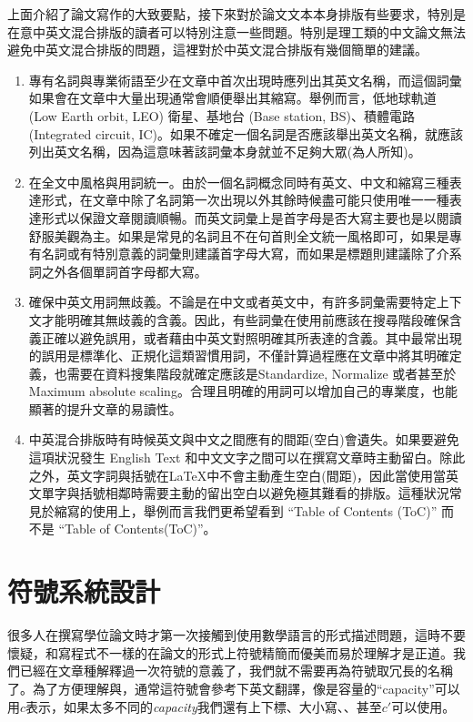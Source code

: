\documentclass[12pt]{report}
\theoremstyle{plain}
\begin{document}
上面介紹了論文寫作的大致要點，接下來對於論文文本本身排版有些要求，特別是在意中英文混合排版的讀者可以特別注意一些問題。特別是理工類的中文論文無法避免中英文混合排版的問題，這裡對於中英文混合排版有幾個簡單的建議。
\begin{enumerate}
    \item 專有名詞與專業術語至少在文章中首次出現時應列出其英文名稱，而這個詞彙如果會在文章中大量出現通常會順便舉出其縮寫。舉例而言，低地球軌道 (Low Earth orbit, LEO) 衛星、基地台 (Base station, BS)、積體電路 (Integrated circuit, IC)。如果不確定一個名詞是否應該舉出英文名稱，就應該列出英文名稱，因為這意味著該詞彙本身就並不足夠大眾(為人所知)。
    \item 在全文中風格與用詞統一。由於一個名詞概念同時有英文、中文和縮寫三種表達形式，在文章中除了名詞第一次出現以外其餘時候盡可能只使用唯一一種表達形式以保證文章閱讀順暢。而英文詞彙上是首字母是否大寫主要也是以閱讀舒服美觀為主。如果是常見的名詞且不在句首則全文統一風格即可，如果是專有名詞或有特別意義的詞彙則建議首字母大寫，而如果是標題則建議除了介系詞之外各個單詞首字母都大寫。
    \item 確保中英文用詞無歧義。不論是在中文或者英文中，有許多詞彙需要特定上下文才能明確其無歧義的含義。因此，有些詞彙在使用前應該在搜尋階段確保含義正確以避免誤用，或者藉由中英文對照明確其所表達的含義。其中最常出現的誤用是標準化、正規化這類習慣用詞，不僅計算過程應在文章中將其明確定義，也需要在資料搜集階段就確定應該是Standardize, Normalize 或者甚至於 Maximum absolute scaling。合理且明確的用詞可以增加自己的專業度，也能顯著的提升文章的易讀性。
    \item 中英混合排版時有時候英文與中文之間應有的間距(空白)會遺失。如果要避免這項狀況發生 English Text 和中文文字之間可以在撰寫文章時主動留白。除此之外，英文字詞與括號在\LaTeX 中不會主動產生空白(間距)，因此當使用當英文單字與括號相鄰時需要主動的留出空白以避免極其難看的排版。這種狀況常見於縮寫的使用上，舉例而言我們更希望看到 ``Table of Contents (ToC)'' 而不是 ``Table of Contents(ToC)''。
\end{enumerate}

\section{符號系統設計}

很多人在撰寫學位論文時才第一次接觸到使用數學語言的形式描述問題，這時不要懷疑，和寫程式不一樣的在論文的形式上符號精簡而優美而易於理解才是正道。我們已經在文章種解釋過一次符號的意義了，我們就不需要再為符號取冗長的名稱了。為了方便理解與，通常這符號會參考下英文翻譯，像是容量的``capacity''可以用$c$表示，如果太多不同的\textit{capacity}我們還有上下標、大小寫、、甚至$c'$可以使用。
\end{document}
